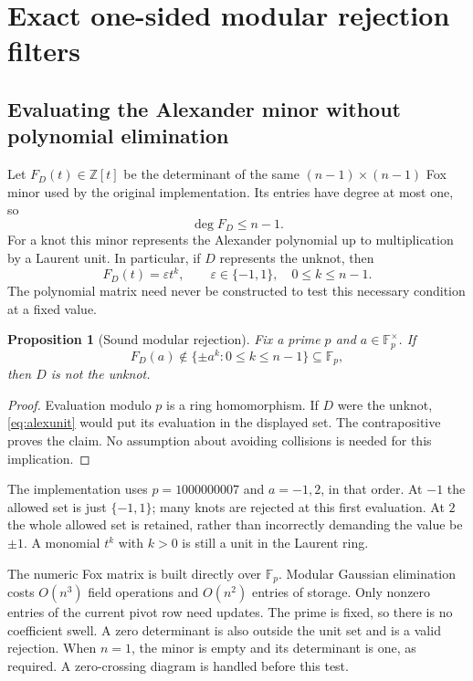 \documentclass[11pt,letterpaper]{article}
\newtheorem{proposition}[theorem]{Proposition}
\theoremstyle{definition}\newtheorem{definition}[theorem]{Definition}
\theoremstyle{remark}\newtheorem{remark}[theorem]{Remark}
\newcommand{\F}{\mathbb F}
\newcommand{\Z}{\mathbb Z}
\begin{document}
\section{Exact one-sided modular rejection filters}

\subsection{Evaluating the Alexander minor without polynomial elimination}

Let $F_D(t)\in\Z[t]$ be the determinant of the same $(n-1)\times(n-1)$ Fox
minor used by the original implementation. Its entries have degree at most one,
so
\[
 \deg F_D\le n-1.
\]
For a knot this minor represents the Alexander polynomial up to multiplication
by a Laurent unit. In particular, if $D$ represents the unknot, then
\begin{equation}\label{eq:alexunit}
 F_D(t)=\varepsilon t^k,\qquad
 \varepsilon\in\{-1,1\},\quad 0\le k\le n-1.
\end{equation}
The polynomial matrix need never be constructed to test this necessary
condition at a fixed value.

\begin{proposition}[Sound modular rejection]\label{prop:alex}
Fix a prime $p$ and $a\in\F_p^\times$. If
\[
 F_D(a)\notin \{\pm a^k:0\le k\le n-1\}\subseteq\F_p,
\]
then $D$ is not the unknot.
\end{proposition}
\begin{proof}
Evaluation modulo $p$ is a ring homomorphism. If $D$ were the unknot,
\eqref{eq:alexunit} would put its evaluation in the displayed set. The
contrapositive proves the claim. No assumption about avoiding collisions is
needed for this implication.
\end{proof}

The implementation uses $p=1000000007$ and $a=-1,2$, in that order. At $-1$ the
allowed set is just $\{-1,1\}$; many knots are rejected at this first evaluation.
At $2$ the whole allowed set is retained, rather than incorrectly demanding the
value be $\pm1$. A monomial $t^k$ with $k>0$ is still a unit in the Laurent ring.

The numeric Fox matrix is built directly over $\F_p$. Modular Gaussian
elimination costs $O(n^3)$ field operations and $O(n^2)$ entries of storage.
Only nonzero entries of the current pivot row need updates. The prime is fixed,
so there is no coefficient swell. A zero determinant is also outside the unit
set and is a valid rejection. When $n=1$, the minor is empty and its determinant
is one, as required. A zero-crossing diagram is handled before this test.
\end{document}
